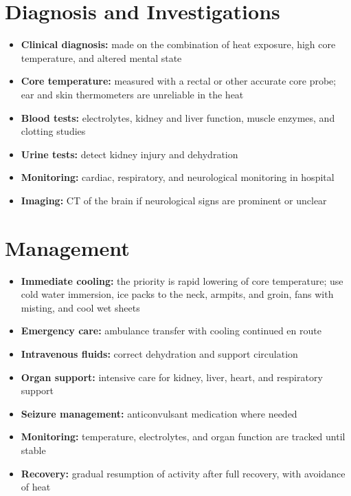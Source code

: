 \section*{Diagnosis and Investigations}
\begin{itemize}
    \item \textbf{Clinical diagnosis:} made on the combination of heat exposure, high core temperature, and altered mental state
    \item \textbf{Core temperature:} measured with a rectal or other accurate core probe; ear and skin thermometers are unreliable in the heat
    \item \textbf{Blood tests:} electrolytes, kidney and liver function, muscle enzymes, and clotting studies
    \item \textbf{Urine tests:} detect kidney injury and dehydration
    \item \textbf{Monitoring:} cardiac, respiratory, and neurological monitoring in hospital
    \item \textbf{Imaging:} CT of the brain if neurological signs are prominent or unclear
\end{itemize}

\section*{Management}
\begin{itemize}
    \item \textbf{Immediate cooling:} the priority is rapid lowering of core temperature; use cold water immersion, ice packs to the neck, armpits, and groin, fans with misting, and cool wet sheets
    \item \textbf{Emergency care:} ambulance transfer with cooling continued en route
    \item \textbf{Intravenous fluids:} correct dehydration and support circulation
    \item \textbf{Organ support:} intensive care for kidney, liver, heart, and respiratory support
    \item \textbf{Seizure management:} anticonvulsant medication where needed
    \item \textbf{Monitoring:} temperature, electrolytes, and organ function are tracked until stable
    \item \textbf{Recovery:} gradual resumption of activity after full recovery, with avoidance of heat
\end{itemize}

